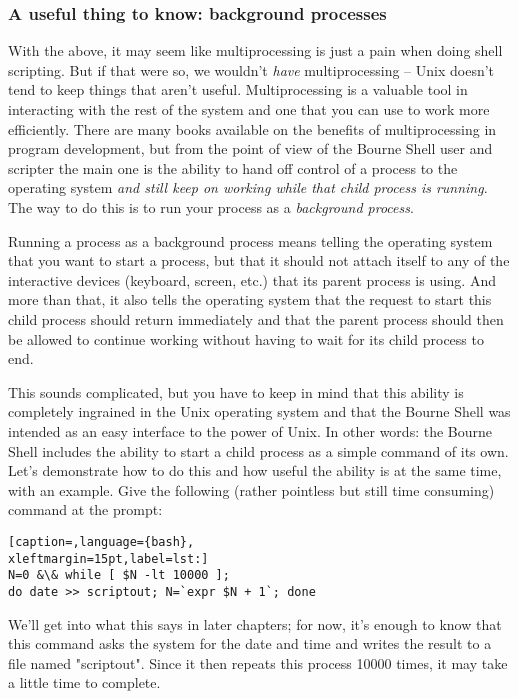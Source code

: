\subsubsection{A useful thing to know: background processes}
With the above, it may seem like multiprocessing is just a pain when doing
shell scripting. But if that were so, we wouldn't \textit{have} multiprocessing
-- Unix doesn't tend to keep things that aren't useful. Multiprocessing is a
valuable tool in interacting with the rest of the system and one that you can
use to work more efficiently. There are many books available on the benefits of
multiprocessing in program development, but from the point of view of the
Bourne Shell user and scripter the main one is the ability to hand off control
of a process to the operating system \textit{and still keep on working while
that child process is running}. The way to do this is to run your process as a
\textit{background process}.

Running a process as a background process means telling the operating system
that you want to start a process, but that it should not attach itself to any
of the interactive devices (keyboard, screen, etc.) that its parent process is
using. And more than that, it also tells the operating system that the request
to start this child process should return immediately and that the parent
process should then be allowed to continue working without having to wait for
its child process to end.

This sounds complicated, but you have to keep in mind that this ability is
completely ingrained in the Unix operating system and that the Bourne Shell was
intended as an easy interface to the power of Unix. In other words: the Bourne
Shell includes the ability to start a child process as a simple command of its
own. Let's demonstrate how to do this and how useful the ability is at the same
time, with an example. Give the following (rather pointless but still time
consuming) command at the prompt:
\lstset{basicstyle=\scriptsize, numbers=left, captionpos=b, tabsize=4}
\begin{lstlisting}[caption=,language={bash},
xleftmargin=15pt,label=lst:]
N=0 &\& while [ $N -lt 10000 ];
do date >> scriptout; N=`expr $N + 1`; done
\end{lstlisting}

We'll get into what this says in later chapters; for now, it's enough to know
that this command asks the system for the date and time and writes the result
to a file named "scriptout". Since it then repeats this process 10000 times, it
may take a little time to complete.

